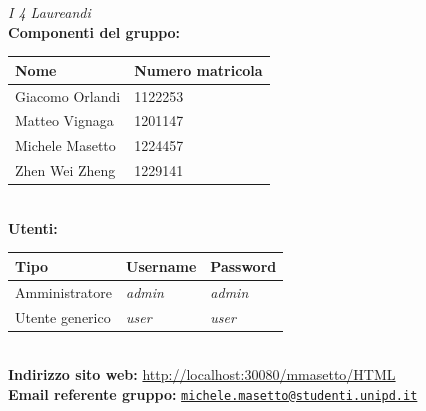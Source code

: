 \begin{center}
	\textit{I 4 Laureandi}\\
	\bigskip
	\textbf{Componenti del gruppo:}\\
	\bigskip
	\begin{tabular}{| C{4.5cm} | C{4.5cm} |}
		\hline
		\textbf{Nome} & \textbf{Numero matricola}\\
		\hline
		Giacomo Orlandi & 1122253\\
		Matteo Vignaga & 1201147\\
		Michele Masetto & 1224457\\
		Zhen Wei Zheng & 1229141\\
		\hline
	\end{tabular}\\
	\bigskip
	\bigskip
	\textbf{Utenti:}\\
	\bigskip
	\begin{tabular}{| C{2.9cm} | C{2.9cm} | C{2.9cm} |}
		\hline
		\textbf{Tipo} & \textbf{Username} & \textbf{Password}\\
		\hline
		Amministratore & \textit{admin} & \textit{admin}\\
		Utente generico & \textit{user} & \textit{user}\\
		\hline
	\end{tabular}\\
	\vfill
	\textbf{Indirizzo sito web:}  \url{http://localhost:30080/mmasetto/HTML}\\
	\textbf{Email referente gruppo:}
	\texttt{\href{mailto:michele.masetto@studenti.unipd.it}{michele.masetto@studenti.unipd.it}}\\
	\vspace{0.75cm}
\end{center}